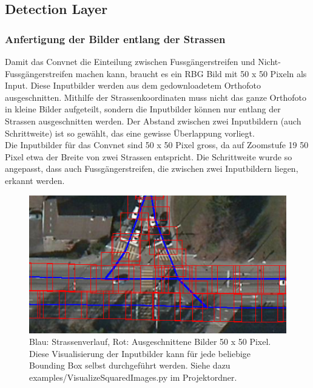 
\subsection{Detection Layer}

\subsubsection{Anfertigung der Bilder entlang der Strassen}
Damit das Convnet die Einteilung zwischen Fussgängerstreifen und Nicht-Fussgängerstreifen machen kann, braucht es ein RBG Bild mit 50 x 50 Pixeln als Input. Diese \Gls{Inputbild}er werden aus dem gedownloadetem Orthofoto ausgeschnitten. Mithilfe der Strassenkoordinaten muss nicht das ganze Orthofoto in kleine Bilder aufgeteilt, sondern die Inputbilder können nur entlang der Strassen ausgeschnitten werden. Der Abstand zwischen zwei Inputbildern (auch Schrittweite) ist so gewählt, das eine gewisse Überlappung vorliegt.\\

Die Inputbilder für das Convnet sind 50 x 50 Pixel gross, da auf Zoomstufe 19 50 Pixel etwa der Breite von zwei Strassen entspricht. Die Schrittweite wurde so angepasst, dass auch Fussgängerstreifen, die zwischen zwei Inputbildern liegen, erkannt werden.
\\
\begin{figure}[H]
	\centering
	\includegraphics{images/squared_images.png}
	\caption[Anfertigung Inputbilder]{Blau: Strassenverlauf, Rot: Ausgeschnittene Bilder 50 x 50 Pixel. Diese Visualisierung der Inputbilder kann für jede beliebige Bounding Box selbst durchgeführt werden. Siehe dazu examples/VisualizeSquaredImages.py im Projektordner.}
\end{figure}



